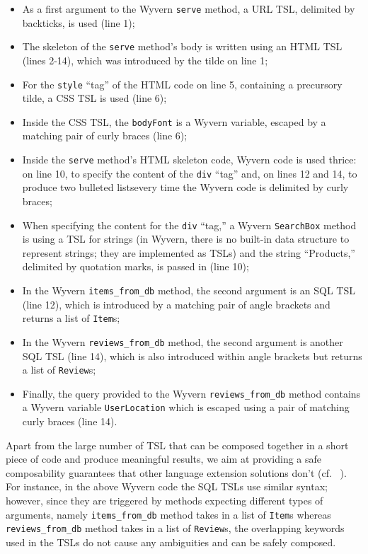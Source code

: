 \begin{itemize}
\item As a first argument to the Wyvern \lstinline{serve} method, a URL TSL, delimited by backticks, is used (line 1);
\item The skeleton of the \lstinline{serve} method's body is written using an HTML TSL (lines 2-14), which was introduced by the tilde on line 1;
\item For the \lstinline{style} ``tag'' of the HTML code on line 5, containing a precursory tilde, a CSS TSL is used (line 6);
\item Inside the CSS TSL, the \lstinline{bodyFont} is a Wyvern variable, escaped by a matching pair of curly braces (line 6);
\item Inside the \lstinline{serve} method's HTML skeleton code, Wyvern code is used thrice: on line 10, to specify the content of the \lstinline{div} ``tag'' and, on lines 12 and 14, to produce two bulleted lists\textemdash every time the Wyvern code is delimited by curly braces;
\item When specifying the content for the \lstinline{div} ``tag,'' a Wyvern \lstinline{SearchBox} method is using a TSL for strings (in Wyvern, there is no built-in data structure to represent strings; they are implemented as TSLs) and the string ``Products,'' delimited by quotation marks, is passed in (line 10);
\item In the Wyvern \lstinline{items_from_db} method, the second argument is an SQL TSL (line 12), which is introduced by a matching pair of angle brackets and returns a list of \lstinline{Item}s;
\item In the Wyvern \lstinline{reviews_from_db} method, the second argument is another SQL TSL (line 14), which is also introduced within angle brackets but returns a list of \lstinline{Review}s;
\item Finally, the query provided to the Wyvern \lstinline{reviews_from_db} method contains a Wyvern variable \lstinline{UserLocation} which is escaped using a pair of matching curly braces (line 14).
\end{itemize}

Apart from the large number of TSL that can be composed together in a short piece of code and produce meaningful results, we aim at providing a safe composability guarantees that other language extension solutions don't (cf.~\cite{Erdweg:2013:FEL:2517208.2517210} ). For instance, in the above Wyvern code the SQL TSLs use similar syntax; however, since they are triggered by methods expecting different types of arguments, namely \lstinline{items_from_db} method takes in a list of \lstinline{Item}s whereas \lstinline{reviews_from_db} method takes in a list of \lstinline{Review}s, the overlapping keywords used in the TSLs do not cause any ambiguities and can be safely composed.

